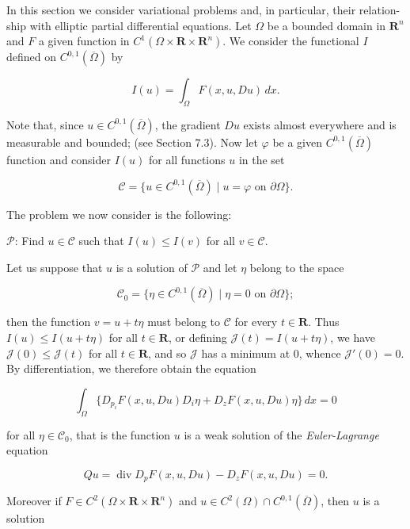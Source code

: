 In this section we consider variational problems and, in particular, their relation-
ship with elliptic partial differential equations. Let $\Omega$ be a bounded domain in $\mathbf{R}^n$
and $F$ a given function in $C^1(\Omega \times \mathbf{R} \times \mathbf{R}^n)$. We consider the functional $I$ defined
on $C^{0,1}(\overline{\Omega})$ by

\begin{equation}
\tag{11.18}
I(u)=\int_{\Omega} F(x, u, Du)\,dx.
\end{equation}

Note that, since $u \in C^{0,1}(\overline{\Omega})$, the gradient $Du$ exists almost everywhere and is
measurable and bounded; (see Section 7.3). Now let $\varphi$ be a given $C^{0,1}(\overline{\Omega})$ function
and consider $I(u)$ for all functions $u$ in the set

\[
\mathcal{C}=\{u \in C^{0,1}(\overline{\Omega}) \mid u=\varphi \text{ on } \partial\Omega\}.
\]

The problem we now consider is the following:

$\mathscr{P}$: Find $u \in \mathcal{C}$ such that $I(u) \leq I(v)$ for all $v \in \mathcal{C}$.

Let us suppose that $u$ is a solution of $\mathscr{P}$ and let $\eta$ belong to the space

\[
\mathcal{C}_0=\{\eta \in C^{0,1}(\overline{\Omega}) \mid \eta=0 \text{ on } \partial\Omega\};
\]

then the function $v=u+t\eta$ must belong to $\mathcal{C}$ for every $t \in \mathbf{R}$. Thus $I(u) \leq I(u+t\eta)$
for all $t \in \mathbf{R}$, or defining $\mathscr{J}(t)=I(u+t\eta)$, we have $\mathscr{J}(0) \leq \mathscr{J}(t)$ for all $t \in \mathbf{R}$, and so
$\mathscr{J}$ has a minimum at $0$, whence $\mathscr{J}'(0)=0$. By differentiation, we therefore obtain
the equation

\begin{equation}
\tag{11.19}
\int_{\Omega} \{D_{p_i}F(x, u, Du)D_i\eta + D_zF(x, u, Du)\eta\}\,dx=0
\end{equation}

for all $\eta \in \mathcal{C}_0$, that is the function $u$ is a weak solution of the \emph{Euler-Lagrange}
equation

\begin{equation}
\tag{11.20}
Qu=\operatorname{div} D_pF(x, u, Du)-D_zF(x, u, Du)=0.
\end{equation}

Moreover if $F \in C^2(\Omega \times \mathbf{R} \times \mathbf{R}^n)$ and $u \in C^2(\Omega)\cap C^{0,1}(\overline{\Omega})$, then $u$ is a solution

